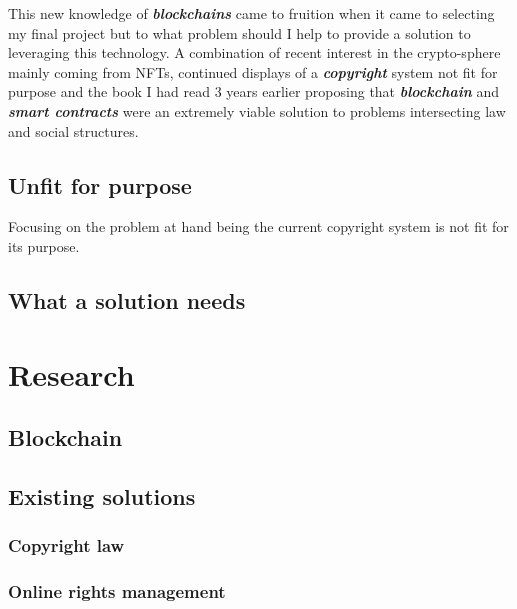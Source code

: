 \documentclass[12pt]{article}
\newcommand{\keyword}[1]{\textbf{\textit{#1}}}
\begin{document}
This new knowledge of \keyword{blockchains} came to fruition when it came to selecting my final project but to what problem should I help to provide a solution to leveraging this technology. A combination of recent interest in the crypto-sphere mainly coming from NFTs, continued displays of a \keyword{copyright} system not fit for purpose\cite{DMCA-abuse} and the book I had read 3 years earlier proposing that \keyword{blockchain} and \keyword{smart contracts} were an extremely viable solution to problems intersecting law and social structures.

\subsection{Unfit for purpose}


Focusing on the problem at hand being the current copyright system is not fit for its purpose. 

\subsection{What a solution needs}


\section{Research}
\subsection{Blockchain}

\subsection{Existing solutions}

\subsubsection{Copyright law}
\subsubsection{Online rights management}
\end{document}
